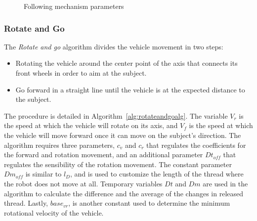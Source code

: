\documentclass[journal]{IEEEtran}
\begin{document}
\begin{figure}[]
    \caption{Following mechanism parameters}
    \label{fig:follow_params}
\end{figure}{}

\subsubsection{Rotate and Go}

The \textit{Rotate and go} algorithm divides the vehicle movement in two steps:

\begin{itemize}
\item Rotating the vehicle around the center point of the axis that connects its front wheels in order to aim at the subject.
\item Go forward in a straight line until the vehicle is at the expected distance to the subject.
\end{itemize}

The procedure is detailed in Algorithm~\ref{alg:rotateandgoalg}.  The variable $V_r$ is the speed at which the vehicle will rotate on its axis, and $V_f$ is the speed at which the vehicle will move forward once it can move on the subject's direction.  The algorithm requires three parameters, $c_v$ and $c_r$ that regulates the coefficients for the forward and rotation movement, and an additional parameter $Dt_{off}$ that regulates the sensibility of the rotation movement.  The constant parameter $Dm_{off}$ is similar to $l_D$, and is used to customize the length of the thread where the robot does not move at all. Temporary variables $Dt$ and $Dm$ are used in the algorithm to calculate the difference and the average of the changes in released thread. Lastly, $base_{vr}$, is another constant used to determine the minimum rotational velocity of the vehicle.
\end{document}
